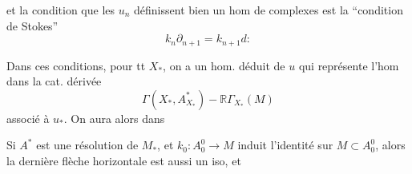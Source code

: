 
et la condition que les $u_n$ définissent bien un hom de complexes est la ``condition de Stokes''
\[
k_n\partial_{n+1}=k_{n+1}d:
\]

Dans ces conditions, pour tt $X_*$, on a un hom.  déduit de $u$
qui représente l'hom dans la cat. dérivée
\[
\Gamma(X_*,A_{X_*}^*)\mathbin{-}\mathbb R\Gamma_{X_*}(M)
\]
associé à $u_*$. On aura alors  dans

Si $A^*$ est une résolution de $M_*$, et $k_0:A_0^0\longrightarrow M$ induit l'identité sur $M\subset A_0^0$, alors la dernière flèche horizontale est aussi un iso, et

